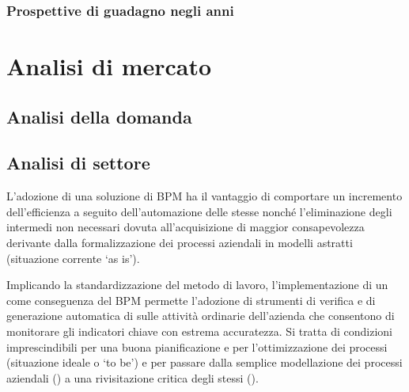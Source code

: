        \subsubsection{ Prospettive di guadagno negli anni}





\clearpage

\section{Analisi di mercato}
\subsection{Analisi della domanda}

\subsection{Analisi di settore}

L'adozione di una soluzione di BPM ha il vantaggio di comportare un incremento dell'efficienza a seguito dell'automazione delle stesse nonché l'eliminazione degli  intermedi non necessari dovuta all'acquisizione di maggior consapevolezza derivante dalla formalizzazione dei processi aziendali in modelli astratti (situazione corrente `as is').

Implicando la standardizzazione del metodo di lavoro, l'implementazione di un  come conseguenza del BPM permette l'adozione di strumenti di verifica e di generazione automatica di  sulle attività ordinarie dell'azienda che consentono di monitorare gli indicatori chiave con estrema accuratezza. Si tratta di condizioni imprescindibili per una buona pianificazione e per l'ottimizzazione dei processi (situazione ideale o `to be') e per passare dalla semplice modellazione dei processi aziendali (\bsn {}) a una rivisitazione critica degli stessi (\bsn {}).

